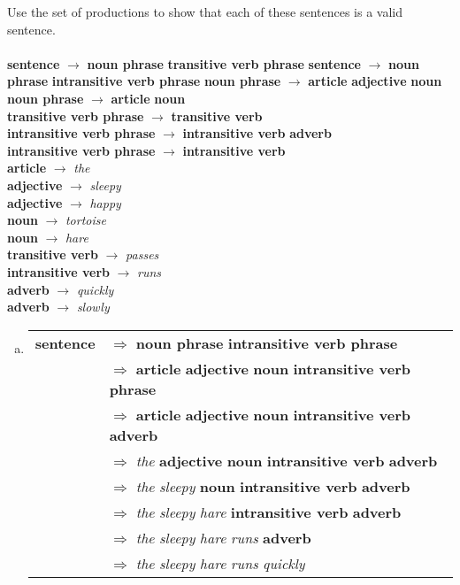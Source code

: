 \documentclass[../main.tex]{subfiles}
\begin{document}
Use the set of productions to show that each of these sentences is a valid sentence. \\
\\
{\bf sentence} $\rightarrow$ {\bf noun phrase} {\bf transitive verb phrase}
{\bf sentence} $\rightarrow$ {\bf noun phrase} {\bf intransitive verb phrase}
{\bf noun phrase} $\rightarrow$ {\bf article} {\bf adjective} {\bf noun} \\
{\bf noun phrase} $\rightarrow$ {\bf article} {\bf noun} \\
{\bf transitive verb phrase} $\rightarrow$ {\bf transitive verb} \\
{\bf intransitive verb phrase} $\rightarrow$ {\bf intransitive verb} {\bf adverb} \\
{\bf intransitive verb phrase} $\rightarrow$ {\bf intransitive verb} \\
{\bf article} $\rightarrow$ {\it the} \\
{\bf adjective} $\rightarrow$ {\it sleepy} \\
{\bf adjective} $\rightarrow$ {\it happy} \\
{\bf noun} $\rightarrow$ {\it tortoise} \\
{\bf noun} $\rightarrow$ {\it hare} \\
{\bf transitive verb} $\rightarrow$ {\it passes} \\
{\bf intransitive verb} $\rightarrow$ {\it runs} \\
{\bf adverb} $\rightarrow$ {\it quickly} \\
{\bf adverb} $\rightarrow$ {\it slowly}

\solution
\begin{enumerate}[a)]
	\item \hfill
		\begin{tabular}{ll}
			{\bf sentence} & $\Rightarrow$ {\bf noun phrase} {\bf intransitive verb phrase} \\
			               & $\Rightarrow$ {\bf article} {\bf adjective} {\bf noun} {\bf intransitive verb phrase} \\
						   & $\Rightarrow$ {\bf article} {\bf adjective} {\bf noun} {\bf intransitive verb} {\bf adverb} \\
						   & $\Rightarrow$ {\it the} {\bf adjective} {\bf noun} {\bf intransitive verb} {\bf adverb} \\
						   & $\Rightarrow$ {\it the} {\it sleepy} {\bf noun} {\bf intransitive verb} {\bf adverb} \\
						   & $\Rightarrow$ {\it the} {\it sleepy} {\it hare} {\bf intransitive verb} {\bf adverb} \\
						   & $\Rightarrow$ {\it the} {\it sleepy} {\it hare} {\it runs} {\bf adverb} \\
						   & $\Rightarrow$ {\it the} {\it sleepy} {\it hare} {\it runs} {\it quickly} \\
		\end{tabular}
\end{enumerate}
\end{document}
